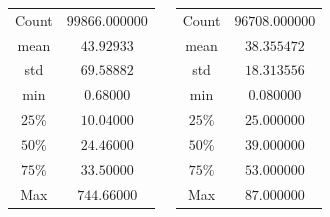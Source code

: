 \documentclass{tikzposter} %
\begin{document}
\begin{columns}
{\begin{minipage}{\textwidth}
	\begin{minipage}[t]{0.22\textwidth}
		\makeatletter{}
	\begin{center}	
	\begin{tabular}{c|c}
	\toprule
	\midrule
	{Count}
	&  {$99866.000000$} \\
	{mean}
	&  {$43.92933$} \\
	{std}
	&  {$69.58882$} \\
	{min}
	&  {$0.68000$} \\
	{$25\%$}
	&  {$10.04000$} \\
	{$50\%$}
	&  {$24.46000$} \\
	{$75\%$}
	&  {$33.50000$} \\
	{Max}
	&  {$744.66000$} \\
	\bottomrule
\end{tabular}
\end{center}	
	\end{minipage}
	\begin{minipage}[t]{0.22\textwidth}
		\makeatletter{}
	\begin{center}	
	\begin{tabular}{c|c}
	\toprule
	\midrule
	{Count}
	&  {$96708.000000$} \\
	{mean}
	&  {$38.355472$} \\
	{std}
	&  {$18.313556$} \\
	{min}
	&  {$ 0.080000$} \\
	{$25\%$}
	&  {$25.000000$} \\
	{$50\%$}
	&  {$39.000000$} \\
	{$75\%$}
	&  {$ 53.000000$} \\
	{Max}
	&  {$87.000000$} \\
	\bottomrule
\end{tabular}
\end{center}	
\end{minipage}
\end{minipage}


}





\end{columns}
\end{document}
